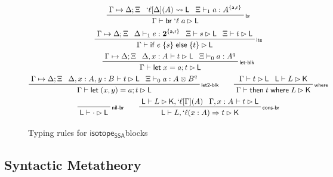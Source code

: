 \documentclass[acmsmall,screen,review]{acmart}
\newcommand{\mb}[1]{\ensuremath{\mathbf{#1}}}
\newcommand{\ms}[1]{\ensuremath{\mathsf{#1}}}
\newcommand{\lbl}[1]{{`#1}}
\newcommand{\lto}{\Rightarrow}
\newcommand{\letstmt}[3]{\ensuremath{\ms{let}\;#1 = #2; #3}}
\newcommand{\brb}[2]{\ms{br}\;#1\;#2}
\newcommand{\lbrb}[2]{\brb{\lbl{#1}}{#2}}
\newcommand{\ite}[3]{\ms{if}\;#1\;\{#2\}\;\ms{else}\;\{#3\}}
\newcommand{\ewhere}[2]{\ms{then}\;#1\;\ms{where}\;#2}
\newcommand{\wbranch}[3]{#1(#2) \lto #3}
\newcommand{\lwbranch}[3]{\wbranch{\lbl{#1}}{#2}{#3}}
\newcommand{\csplits}[3]{#1 \mapsto #2;#3}
\newcommand{\lwk}[2]{#1 \rightsquigarrow #2}
\newcommand{\thyp}[3]{#1: {#2}^{#3}}
\newcommand{\lhyp}[3]{#1[#2](#3)}
\newcommand{\llhyp}[3]{\lhyp{\lbl{#1}}{#2}{#3}}
\newcommand{\rle}[1]{{\scriptsize\textsf{#1}}}
\newcommand{\tint}{{\{\ms{a}, \ms{r}\}}}
\newcommand{\hasty}[5]{#1 \vdash_{#2} #3: {#4}^{#5}}
\newcommand{\haslb}[3]{#1 \vdash #2 \rhd #3}
\newcommand{\lhaslb}[3]{#1 \vdash #2 \rhd #3}
\newcommand{\isotopessa}{\ms{isotope_{SSA}}}
\begin{document}
\begin{figure}
  \begin{gather*}    
    \prftree[r]{\rle{br}}
      {\csplits{\Gamma}{\Delta}{\Xi}}
      {\lwk{\llhyp{\ell}{\Delta}{A}}{\ms{L}}}
      {\hasty{\Xi}{1}{a}{A}{\tint}}
      {\haslb{\Gamma}{\lbrb{\ell}{a}}{\ms{L}}} 
    \\
    \prftree[r]{\rle{ite}}
      {\csplits{\Gamma}{\Delta}{\Xi}}
      {\hasty{\Delta}{1}{e}{\mb{2}}{\tint}}
      {\haslb{\Xi}{s}{\ms{L}}}
      {\haslb{\Xi}{t}{\ms{L}}}
      {\haslb{\Gamma}{\ite{e}{s}{t}}{\ms{L}}} 
    \\
    \prftree[r]{\rle{let-blk}}
      {\csplits{\Gamma}{\Delta}{\Xi}}
      {\haslb{\Delta, \thyp{x}{A}{}}{t}{\ms{L}}}
      {\hasty{\Xi}{0}{a}{A}{q}}
      {\haslb{\Gamma}{\letstmt{x}{a}{t}}{\ms{L}}} 
    \\
    \prftree[r]{\rle{let2-blk}}
      {\csplits{\Gamma}{\Delta}{\Xi}}
      {\haslb{\Delta, \thyp{x}{A}{}, \thyp{y}{B}{}}{t}{\ms{L}}}
      {\hasty{\Xi}{0}{a}{A \otimes B}{q}}
      {\haslb{\Gamma}{\letstmt{(x, y)}{a}{t}}{\ms{L}}} \qquad
    \prftree[r]{\rle{where}}
      {\haslb{\Gamma}{t}{\ms{L}}}
      {\lhaslb{\ms{L}}{L}{\ms{K}}}
      {\haslb{\Gamma}{\ewhere{t}{L}}{\ms{K}}}
    \\
    \prftree[r]{\rle{nil-br}}
      {\lhaslb{\ms{L}}{\cdot}{\ms{L}}} \qquad
    \prftree[r]{\rle{cons-br}}
      {\lhaslb{\ms{L}}{L}{\ms{K}, \llhyp{\ell}{\Gamma}{A}}}
      {\haslb{\Gamma, \thyp{x}{A}{}}{t}{\ms{L}}}
      {\lhaslb{\ms{L}}{L, \lwbranch{\ell}{x: A}{t}}{\ms{K}}}
  \end{gather*}
  \caption{Typing rules for \isotopessa blocks}
  \label{fig:ssa-block-typing}
\end{figure}

\subsection{Syntactic Metatheory}
\end{document}
